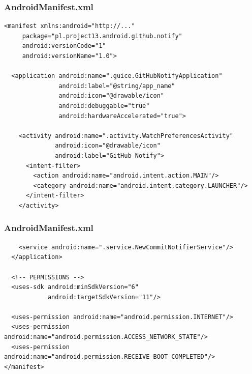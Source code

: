 \documentclass{beamer}
\begin{document}
\begin{frame}[fragile]\frametitle{AndroidManifest.xml}
\begin{lstlisting}
<manifest xmlns:android="http://..."
     package="pl.project13.android.github.notify"
     android:versionCode="1"
     android:versionName="1.0">

  <application android:name=".guice.GitHubNotifyApplication"
               android:label="@string/app_name"
               android:icon="@drawable/icon"
               android:debuggable="true"
               android:hardwareAccelerated="true">

    <activity android:name=".activity.WatchPreferencesActivity"
              android:icon="@drawable/icon"
              android:label="GitHub Notify">
      <intent-filter>
        <action android:name="android.intent.action.MAIN"/>
        <category android:name="android.intent.category.LAUNCHER"/>
      </intent-filter>
    </activity>
\end{lstlisting}
\end{frame}

\begin{frame}[fragile]\frametitle{AndroidManifest.xml}
\begin{lstlisting}
    <service android:name=".service.NewCommitNotifierService"/>
  </application>

  <!-- PERMISSIONS -->
  <uses-sdk android:minSdkVersion="6"
            android:targetSdkVersion="11"/>

  <uses-permission android:name="android.permission.INTERNET"/>
  <uses-permission android:name="android.permission.ACCESS_NETWORK_STATE"/>
  <uses-permission android:name="android.permission.RECEIVE_BOOT_COMPLETED"/>
</manifest>
\end{lstlisting}
\end{frame}
\end{document}
